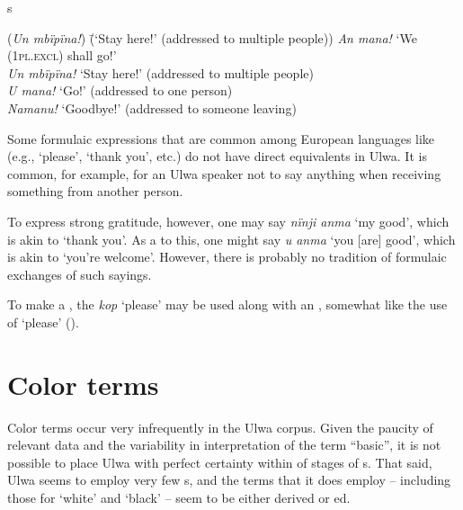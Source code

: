 \ea%
    \label{ex:sem:13}
          s
\begin{tabbing}
{(\textit{Un mbïpïna!})} \= {(‘Stay here!’ (addressed to multiple people))}\kill
{\textit{An mana!}} \> {‘We (1\textsc{pl.excl}) shall go!’}\\
{\textit{Un mbïpïna!}} \> {‘Stay here!’ (addressed to multiple people)}\\
{\textit{U mana!}} \> {‘Go!’ (addressed to one person)}\\
{\textit{Namanu!}} \> {‘Goodbye!’ (addressed to someone leaving)\footnotemark{}}
\end{tabbing}
\z
{}

  Some  formulaic expressions that are common among European languages like  (e.g., ‘please’, ‘thank you’, etc.) do not have direct equivalents in Ulwa. It is common, for example, for an Ulwa speaker not to say anything when receiving something from another person.
  
  To express strong gratitude, however, one may say \textit{nïnji anma} ‘my good’, which is akin to  ‘thank you’. As a  to this, one might say \textit{u anma} ‘you [are] good’, which is akin to ‘you’re welcome’. However, there is probably no tradition of formulaic exchanges of such sayings.

  To make a  , the  \textit{kop} ‘please’ may be used along with an , somewhat like the use of  ‘please’ ().


\section{Color terms}\label{sec:14.5}


Color terms occur very infrequently in the Ulwa corpus. Given the paucity of relevant data and the variability in interpretation of the term “basic”, it is not possible to place Ulwa with perfect certainty within   of stages of s. That said, Ulwa seems to employ very few s, and the terms that it does employ -- including those for ‘white’ and ‘black’ -- seem to be either derived or ed.

